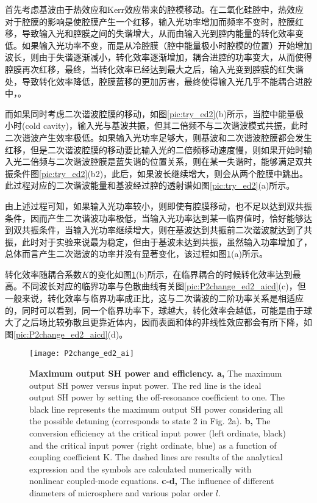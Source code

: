 首先考虑基波由于热效应和Kerr效应带来的腔模移动。在二氧化硅腔中，热效应对于腔膜的影响是使腔膜产生一个红移，输入光功率增加而频率不变时，腔膜红移，导致输入光和腔膜之间的失谐增大，从而由输入光到腔内能量的转化效率变低。如果输入光功率不变，而是从冷腔膜（腔中能量极小时腔模的位置）开始增加波长，则由于失谐逐渐减小，转化效率逐渐增加，耦合进腔的功率变大，从而使得腔膜再次红移，最终，当转化效率已经达到最大之后，输入光变到腔膜的红失谐处，导致转化效率降低，腔膜蓝移的更加厉害，最终使得输入光几乎不能耦合进腔中\cite{carmon2004dynamical}，。

而如果同时考虑二次谐波腔膜的移动，如图\ref{pic:try_ed2}(b)所示，当腔中能量极小时(cold cavity)，输入光与基波共振，但其二倍频不与二次谐波模式共振，此时二次谐波产生效率极低。如果输入光功率足够大，则基波和二次谐波腔膜都会发生红移，但是二次谐波腔膜的移动要比输入光的二倍频移动速度慢，则如果开始时输入光二倍频与二次谐波腔膜是蓝失谐的位置关系，则在某一失谐时，能够满足双共振条件图\ref{pic:try_ed2}(b2)，此后，如果波长继续增大，则会从两个腔膜中跳出。此过程对应的二次谐波能量和基波经过腔的透射谱如图\ref{pic:try_ed2}(a)所示。

由上述过程可知，如果输入光功率较小，则即使有腔膜移动，也不足以达到双共振条件，因而产生二次谐波功率极低，当输入光功率达到某一临界值时，恰好能够达到双共振条件，当输入光功率继续增大，则在基波达到共振前二次谐波就达到了共振，此时对于实验来说最为稳定，但由于基波未达到共振，虽然输入功率增加了，总体而言产生二次谐波的功率并没有显著变化，该过程如图\ref{pic:P2change_ed2_ai}(a)所示。

转化效率随耦合系数$K$的变化如图\ref{pic:P2change_ed2_ai}(b)所示，在临界耦合的时候转化效率达到最高。不同波长对应的临界功率与色散曲线有关图\ref{pic:P2change_ed2_aicd}(c)，但一般来说，转化效率与临界功率成正比，这与二次谐波的二阶功率关系是相适应的，同时可以看到，同一个临界功率下，球越大，转化效率会越低，可能是由于球大了之后场比较弥散且更靠近体内，因而表面和体的非线性效应都会有所下降，如图\ref{pic:P2change_ed2_aicd}(d)。
\begin{figure}
\texttt{[image: P2change\_ed2\_ai]}
\centering
\caption{\textbf{Maximum output SH power and efficiency. a,} The maximum output SH power versus input power. The red line is the ideal output SH power by setting the off-resonance coefficient to one. The black line represents the maximum output SH power considering all the possible detuning (corresponds to state 2 in Fig. 2a). \textbf{b, } The conversion efficiency at the critical input power (left ordinate, black) and the critical input power (right ordinate, blue) as a function of coupling coefficient K. The dashed lines are results of the analytical expression and the symbols are calculated numerically with nonlinear coupled-mode equations. \textbf{c-d, } The influence of different diameters of microsphere and various polar order $l$. }
\label{pic:P2change_ed2_ai}
\end{figure}

